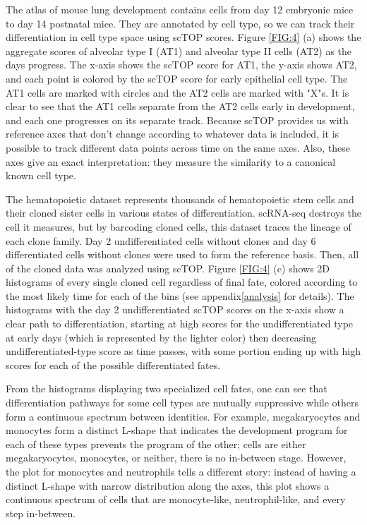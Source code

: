 \documentclass[aps,superscriptaddress, notitlepage,longbibliography]{revtex4-1}
\begin{document}
The atlas of mouse lung development\cite{negretti_single-cell_2021} contains cells from day 12 embryonic mice to day 14 postnatal mice. They are annotated by cell type, so we can track their differentiation in cell type space using scTOP scores. Figure \ref{FIG:4} (a) shows the aggregate scores of alveolar type I (AT1) and alveolar type II cells (AT2) as the days progress. The x-axis shows the scTOP score for AT1, the y-axis shows AT2, and each point is colored by the scTOP score for early epithelial cell type. The AT1 cells are marked with circles and the AT2 cells are marked with "X"s. It is clear to see that the AT1 cells separate from the AT2 cells early in development, and each one progresses on its separate track. Because scTOP provides us with reference axes that don't change according to whatever data is included, it is possible to track different data points across time on the same axes. Also, these axes give an exact interpretation: they measure the similarity to a canonical known cell type.

The hematopoietic dataset\cite{weinreb_lineage_2020} represents thousands of hematopoietic stem cells and their cloned sister cells in various states of differentiation. scRNA-seq destroys the cell it measures, but by barcoding cloned cells, this dataset traces the lineage of each clone family. Day 2 undifferentiated cells without clones and day 6 differentiated cells without clones were used to form the reference basis. Then, all of the cloned data was analyzed using scTOP. Figure \ref{FIG:4} (c) shows 2D histograms of every single cloned cell regardless of final fate, colored according to the most likely time for each of the bins (see appendix\ref{analysis} for details). The histograms with the day 2 undifferentiated scTOP scores on the x-axis show a clear path to differentiation, starting at high scores for the undifferentiated type at early days (which is represented by the lighter color) then decreasing undifferentiated-type score as time passes, with some portion ending up with high scores for each of the possible differentiated fates.

From the histograms displaying two specialized cell fates, one can see that differentiation pathways for some cell types are mutually suppressive while others form a continuous spectrum between identities. For example, megakaryocytes and monocytes form a distinct L-shape that indicates the development program for each of these types prevents the program of the other; cells are either megakaryocytes, monocytes, or neither, there is no in-between stage. However, the plot for monocytes and neutrophils tells a different story: instead of having a distinct L-shape with narrow distribution along the axes, this plot shows a continuous spectrum of cells that are monocyte-like, neutrophil-like, and every step in-between. 
\end{document}
